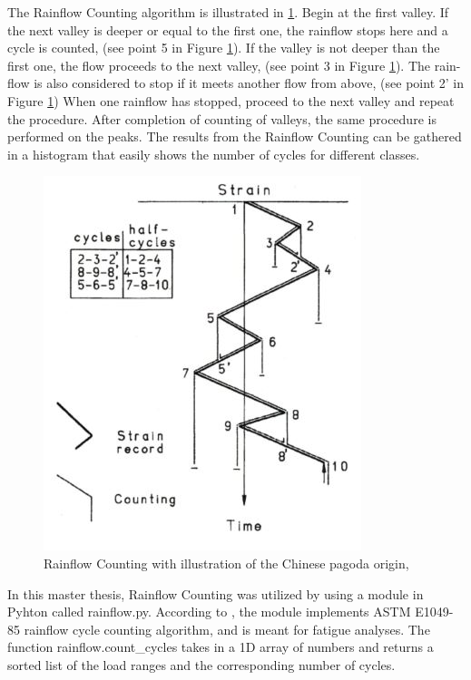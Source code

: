 The Rainflow Counting algorithm is illustrated in \ref{fig:pagoda}. Begin at the first valley. If the next valley is deeper or equal to the first one, the rainflow stops here and a cycle is counted, (see point 5 in Figure \ref{fig:pagoda}). If the valley is not deeper than the first one, the flow proceeds to the next valley, (see point 3 in Figure \ref{fig:pagoda}). The rain-flow is also considered to stop if it meets another flow from above, (see point 2' in Figure \ref{fig:pagoda}) When one rainflow has stopped, proceed to the next valley and repeat the procedure. After completion of counting of valleys, the same procedure is performed on the peaks. The results from the Rainflow Counting can be gathered in a histogram that easily shows the number of cycles for different classes. \begin{figure}[H]
\centering
\includegraphics[scale=0.9]{figures/pagoda}
\caption[$\; \:$Rainflow Counting]{Rainflow Counting with illustration of the Chinese pagoda origin,   \cite{fatigue2016} }
 \label{fig:pagoda}
\end{figure}
\noindent In this master thesis, Rainflow Counting was utilized by using a module in Pyhton called rainflow.py. According to \cite{rf}, the module implements ASTM E1049-85 rainflow cycle counting
algorithm, and is meant for fatigue analyses. The function rainflow.count\_cycles takes in a 1D array of numbers and returns a sorted list of the load ranges and the corresponding
number of cycles.

